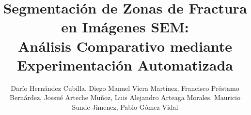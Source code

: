 \documentclass[onecolumn, 12pt , journal]{IEEEtran}
\begin{document}
%
\title{Segmentación de Zonas de Fractura en Imágenes SEM: \\
       Análisis Comparativo mediante Experimentación Automatizada }
%
%
%

\author{
    Darío Hernández Cubilla, 
    Diego Manuel Viera Martínez, 
    Francisco Préstamo Bernárdez, 
    Jossué Arteche Muñoz, 
    Luis Alejandro Arteaga Morales, 
    Mauricio Sunde Jimenez, 
    Pablo Gómez Vidal
    }


\maketitle


\end{document}
